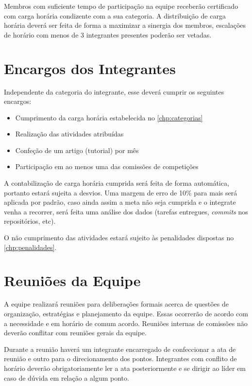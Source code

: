 Membros com suficiente tempo de participação na equipe receberão certificado com carga horária condizente com a sua categoria. A distribuição de carga horária deverá ser feita de forma a maximizar a sinergia dos membros, escalações de horário com menos de 3 integrantes presentes poderão ser vetadas.


\chapter{Encargos dos Integrantes}
\label{chp:encargos}

Independente da categoria do integrante, esse deverá cumprir os seguintes encargos:

\begin{itemize}
\item Cumprimento da carga horária estabelecida no \autoref{chp:categorias}
\item Realização das atividades atribuídas
\item Confeção de um artigo (tutorial) por mês
\item Participação em ao menos uma das comissões de competições
\end{itemize}

A contabilização de carga horária cumprida será feita de forma automática, portanto estará sujeita a desvios. Uma margem de erro de 10\% para mais será aplicada por padrão, caso ainda assim a meta não seja cumprida e o integrate venha a recorrer, será feita uma análise dos dados (tarefas entregues, \textit{commits} nos repositórios, etc).

O não cumprimento das atividades estará sujeito às penalidades dispostas no \autoref{chp:penalidades}. 

\chapter{Reuniões da Equipe}
\label{chp:reunioes}

A equipe realizará reuniões para deliberações formais acerca de questões de organização, estratégias e planejamento da equipe. Essas ocorrerão de acordo com a necessidade e em horário de comum acordo. Reuniões internas de comissões não deverão conflitar com reuniões gerais da equipe.

Durante a reunião haverá um integrante encarregado de confeccionar a ata de reunião e outro para o direcionamento dos pontos. Integrantes com conflito de horário deverão obrigatoriamente ler a ata posteriormente e se dirigir ao líder em caso de dúvida em relação a algum ponto.

